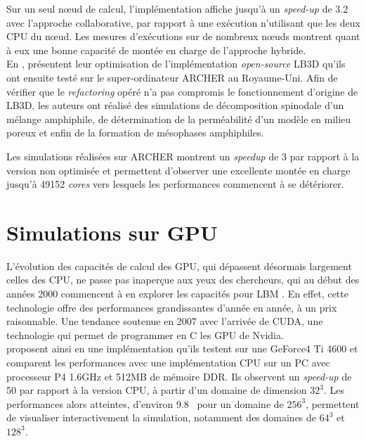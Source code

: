 Sur un seul nœud de calcul, l'implémentation affiche jusqu'à un \textit{speed-up} de 3.2 avec l'approche collaborative, par rapport à une exécution n'utilisant que les deux \acs{CPU} du nœud. Les mesures d'exécutions sur de nombreux nœuds montrent quant à eux une bonne capacité de montée en charge de l'approche hybride.\\

En \citeyear{schmieschek_lb3d_2017}, \citet{schmieschek_lb3d_2017} présentent leur optimisation de l'implémentation \textit{open-source} LB3D qu'ils ont ensuite testé sur le super-ordinateur ARCHER au Royaume-Uni. 
Afin de vérifier que le \textit{refactoring} opéré n'a pas compromis le fonctionnement d'origine de LB3D, les auteurs ont réalisé des simulations de décomposition spinodale d'un mélange amphiphile, de détermination de la perméabilité d'un modèle en milieu poreux et enfin de la formation de mésophases amphiphiles. 

Les simulations réalisées sur ARCHER montrent un \textit{speedup} de 3 par rapport à la version non optimisée et permettent d'observer une excellente montée en charge jusqu'à 49152 \textit{cores} vers lesquels les performances commencent à se détériorer.

\section{Simulations sur \acs{GPU}}
L'évolution des capacités de calcul des \acs{GPU}, qui dépassent désormais largement celles des \acs{CPU}, ne passe pas inaperçue aux yeux des chercheurs, qui au début des années 2000 commencent à en explorer les capacités pour \acs{LBM} \cite{bolz_sparse_2003, buck_brook_2004, kruger_linear_2003}. En effet, cette technologie offre des performances grandissantes d'année en année, à un prix raisonnable. Une tendance soutenue en 2007 avec l'arrivée de CUDA, une technologie qui permet de programmer en C les \acs{GPU} de Nvidia.\\

\citet{li_implementing_2003} proposent ainsi en \citeyear{li_implementing_2003} une implémentation qu'ils testent sur une GeForce4 Ti 4600 et comparent les performances avec une implémentation \acs{CPU} sur un PC avec processeur P4 1.6GHz et 512MB de mémoire DDR. 
Ils observent un \textit{speed-up} de 50 par rapport à la version \acs{CPU}, à partir d'un domaine de dimension $32^3$. Les performances alors atteintes, d'environ 9.8~  pour un domaine de $256^3$, permettent de visualiser interactivement la simulation, notamment des domaines de $64^3$ et $128^3$.\\

